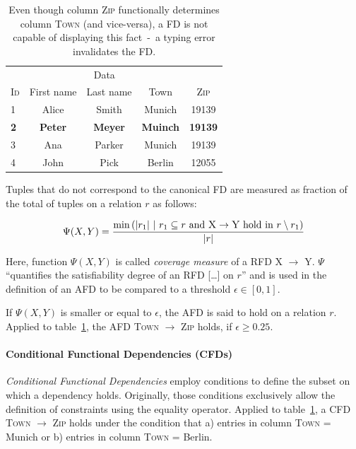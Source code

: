 \begin{table}[ht]
    \centering
    \begin{tabular}{lcccc}
        \toprule
        & \multicolumn{3}{c}{Data} \\ \cmidrule(lr){2-5}
        \textsc{Id} & First name & Last name & Town & \textsc{Zip} \\
        \midrule
        1 & Alice & Smith & Munich & 19139 \\
        \textbf{2} & \textbf{Peter}& \textbf{Meyer} &
        \textbf{Muinch} & \textbf{19139} \\
        3 & Ana & Parker & Munich & 19139  \\
        4 & John & Pick & Berlin & 12055 \\
        \bottomrule
    \end{tabular}
    \caption{Even though column \textsc{Zip} functionally determines column \textsc{Town} (and vice-versa), a FD is not capable of displaying this fact~-~a typing error invalidates the FD.}
    \label{tab:example-afd-necessity}
\end{table}

Tuples that do not correspond to the canonical FD are measured as fraction of the total of tuples on a relation \( r \) as follows:

\begin{align}
    \Psi(X, Y) = \frac{\min{\left(|r_1|~|~r_1 \subseteq r \text{ and } \textsc{X} \rightarrow \textsc{Y} \text{ hold in } r \setminus r_1 \right)}}{|r|}
\end{align}

Here, function \( \Psi(X, Y) \) is called \emph{coverage measure} of a RFD \textsc{X} \( \to \) \textsc{Y}.
\( \Psi \) ``quantifies the satisfiability degree of an RFD [\dots] on \( r \)''\cite[p.~150]{CAR16} and is used in the definition of an AFD to be compared to a threshold \( \epsilon \in [0, 1] \).

If \( \Psi(X, Y) \) is smaller or equal to \( \epsilon \), the AFD is said to hold on a relation \( r \).
Applied to table~\ref{tab:example-afd-necessity}, the AFD \textsc{Town} \( \to \) \textsc{Zip} holds, if \( \epsilon \geq 0.25\).

\paragraph{Conditional Functional Dependencies (CFDs)}
\emph{Conditional Functional Dependencies} employ conditions to define the subset on which a dependency holds.
Originally, those conditions exclusively allow the definition of constraints using the equality operator.\cite[p.~152]{CAR16}
Applied to table~\ref{tab:example-afd-necessity}, a CFD \textsc{Town} \( \to\) \textsc{Zip} holds under the condition that a) entries in column \textsc{Town} = Munich or b) entries in column \textsc{Town} = Berlin.

